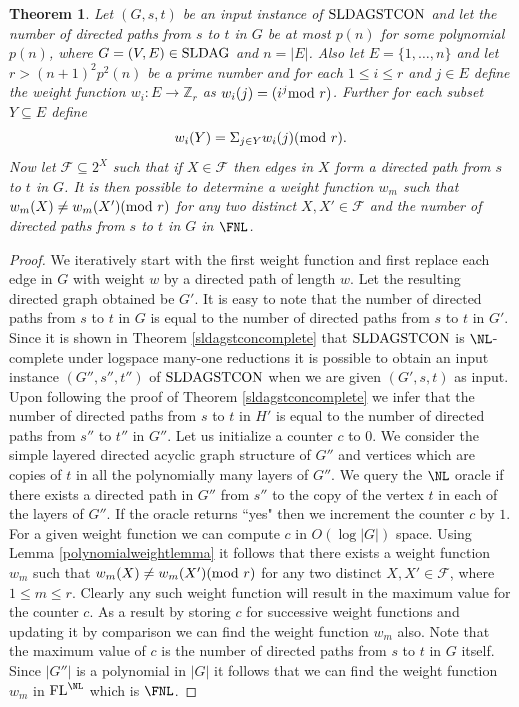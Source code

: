 \documentclass{amsbook}
\newtheorem{theorem}{Theorem}[chapter]
\theoremstyle{definition}
\theoremstyle{remark}
\numberwithin{section}{chapter}
\numberwithin{equation}{chapter}
\newcommand{\FL}{\mbox{\rm FL}}
\renewcommand{\mod}{\mbox{\textrm mod~}}
\newcommand{\Z}{\mathbb{Z}}
\newcommand{\F}{\mathcal{F}}
\newcommand{\LDAG}{\mbox{\rm SLDAG}}
\newcommand{\LDAGSTCON}{\mbox{\rm SLDAGSTCON}}
\begin{document}
\begin{theorem}\label{countdirectedpaths}
Let $(G,s,t)$ be an input instance of $\LDAGSTCON$ and let the number of directed paths from $s$ to $t$ in $G$ be at most $p(n)$ for some polynomial $p(n)$, where $G=(V,E)\in \LDAG$ and $n=|E|$. Also let $E=\{ 1,\ldots ,n\}$ and let $r>(n+1)^2p^2(n)$ be a prime number and for each $1\leq i\leq r$ and $j\in E$ define the weight function $w_i:E\longrightarrow \Z _r$ as $w_i(j)=(i^j \mod r)$. Further for each subset $Y\subseteq E$ define
\[
w_i(Y)=\Sigma_{j\in Y}w_i(j)(\mod r).
\]
Now let $\F\subseteq 2^X$ such that if $X\in \F$ then edges in $X$ form a directed path from $s$ to $t$ in $G$. It is then possible to determine a weight function $w_m$ such that $w_m(X)\neq w_m(X')(\mod r)$ for any two distinct $X,X'\in \F$ and the number of directed paths from $s$ to $t$ in $G$ in $\FNL$.
\end{theorem}

\begin{proof}
We iteratively start with the first weight function and first replace each edge in $G$ with weight $w$ by a directed path of length $w$. Let the resulting directed graph obtained be $G'$. It is easy to note that the number of directed paths from $s$ to $t$ in $G$ is equal to the number of directed paths from $s$ to $t$ in $G'$. Since it is shown in Theorem \ref{sldagstconcomplete} that $\LDAGSTCON$ is $\NL$-complete under logspace many-one reductions it is possible to obtain an input instance $(G'',s'',t'')$ of $\LDAGSTCON$ when we are given $(G',s,t)$ as input. Upon following the proof of Theorem \ref{sldagstconcomplete} we infer that the number of directed paths from $s$ to $t$ in $H'$ is equal to the number of directed paths from $s''$ to $t''$ in $G''$. Let us initialize a counter $c$ to $0$. We consider the simple layered directed acyclic graph structure of $G''$ and vertices which are copies of $t$ in all the polynomially many layers of $G''$. We query the $\NL$ oracle if there exists a directed path in $G''$ from $s''$ to the copy of the vertex $t$ in each of the layers of $G''$. If the oracle returns ``yes" then we increment the counter $c$ by $1$. For a given weight function we can compute $c$ in $O(\log |G|)$ space. Using Lemma \ref{polynomialweightlemma} it follows that there exists a weight function $w_m$ such that $w_m(X)\neq w_m(X')(\mod r)$ for any two distinct $X,X'\in \F$, where $1\leq m\leq r$. Clearly any such weight function will result in the maximum value for the counter $c$. As a result by storing $c$ for successive weight functions and updating it by comparison we can find the weight function $w_m$ also. Note that the maximum value of $c$ is the number of directed paths from $s$ to $t$ in $G$ itself. Since $|G''|$ is a polynomial in $|G|$ it follows that we can find the weight function $w_m$ in $\FL^{\NL}$ which is $\FNL$.
\end{proof}
\end{document}
